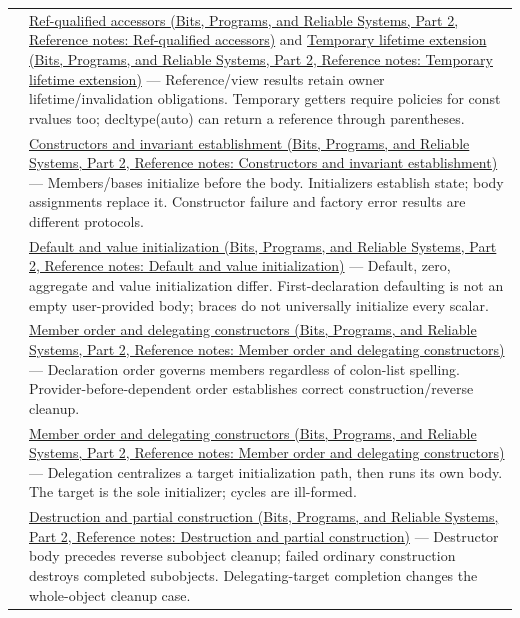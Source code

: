 {\begin{longtable}[]{@{}
  >{\raggedright\arraybackslash}p{}
  >{\raggedright\arraybackslash}p{}@{}}
131 & \href{../01-Bits-Programs-and-Reliable-Systems-P02/main.pdf\#nameddest=appendix-d42039b1d6f7}{Ref-qualified accessors (Bits, Programs, and Reliable Systems, Part 2, Reference notes: Ref-qualified accessors)} and \href{../01-Bits-Programs-and-Reliable-Systems-P02/main.pdf\#nameddest=appendix-a978b29bbbb0}{Temporary lifetime extension (Bits, Programs, and Reliable Systems, Part 2, Reference notes: Temporary lifetime extension)} --- Reference/view results retain owner lifetime/invalidation obligations. Temporary getters require policies for const rvalues too; decltype(auto) can return a reference through parentheses. \\
132 & \href{../01-Bits-Programs-and-Reliable-Systems-P02/main.pdf\#nameddest=appendix-7f8ec83d0886}{Constructors and invariant establishment (Bits, Programs, and Reliable Systems, Part 2, Reference notes: Constructors and invariant establishment)} --- Members/bases initialize before the body. Initializers establish state; body assignments replace it. Constructor failure and factory error results are different protocols. \\
133 & \href{../01-Bits-Programs-and-Reliable-Systems-P02/main.pdf\#nameddest=appendix-ba8c1a9fe03f}{Default and value initialization (Bits, Programs, and Reliable Systems, Part 2, Reference notes: Default and value initialization)} --- Default, zero, aggregate and value initialization differ. First-declaration defaulting is not an empty user-provided body; braces do not universally initialize every scalar. \\
134 & \href{../01-Bits-Programs-and-Reliable-Systems-P02/main.pdf\#nameddest=appendix-3cb49709605a}{Member order and delegating constructors (Bits, Programs, and Reliable Systems, Part 2, Reference notes: Member order and delegating constructors)} --- Declaration order governs members regardless of colon-list spelling. Provider-before-dependent order establishes correct construction/reverse cleanup. \\
135 & \href{../01-Bits-Programs-and-Reliable-Systems-P02/main.pdf\#nameddest=appendix-3cb49709605a}{Member order and delegating constructors (Bits, Programs, and Reliable Systems, Part 2, Reference notes: Member order and delegating constructors)} --- Delegation centralizes a target initialization path, then runs its own body. The target is the sole initializer; cycles are ill-formed. \\
136 & \href{../01-Bits-Programs-and-Reliable-Systems-P02/main.pdf\#nameddest=appendix-9bfe377cef7a}{Destruction and partial construction (Bits, Programs, and Reliable Systems, Part 2, Reference notes: Destruction and partial construction)} --- Destructor body precedes reverse subobject cleanup; failed ordinary construction destroys completed subobjects. Delegating-target completion changes the whole-object cleanup case. \\

\end{longtable}}
